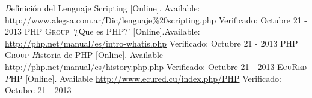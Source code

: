 \documentclass[11pt]{article} %
\begin{document}
\begin{thebibliography}{99}

\bibitem{[1]}  \textit Definición del Lenguaje Scripting [Online]. Available: \url{http://www.alegsa.com.ar/Dic/lenguaje%20scripting.php} Verificado: Octubre 21 - 2013
\bibitem{[2]}  \textsc{ PHP Group} \textit '¿Que es PHP?' [Online].Available: \url{http://php.net/manual/es/intro-whatis.php}  Verificado: Octubre 21 - 2013
\bibitem{[3]}  \textsc{ PHP Group} \textit Historia de PHP [Online]. Available \url{http://php.net/manual/es/history.php.php}  Verificado: Octubre 21 - 2013
\bibitem{[4]}  \textsc{ EcuRed} \textit PHP [Online]. Available \url{http://www.ecured.cu/index.php/PHP}  Verificado: Octubre 21 - 2013
\end{thebibliography}
\end{document}

